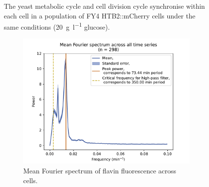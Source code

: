 \begin{figure}
  \caption{
    The yeast metabolic cycle and cell division cycle synchronise within each cell in a population of FY4 HTB2::mCherry cells under the same conditions (\SI{20}{\gram~\litre^{-1}} glucose).
  }
  \label{fig:biology-highglc-sync}
\end{figure}

\begin{figure}
  \centering
  \begin{subfigure}[htpb]{0.4\textwidth}
   \centering
   \includegraphics[width=\textwidth]{by4741_491_13}
   \caption{
    Mean Fourier spectrum of flavin fluorescence across cells.%
   }
   \label{fig:biology-by4741-sync-fourier}
  \end{subfigure}%
  \begin{subfigure}[htpb]{0.4\textwidth}
   \centering

\end{subfigure}
\end{figure}
